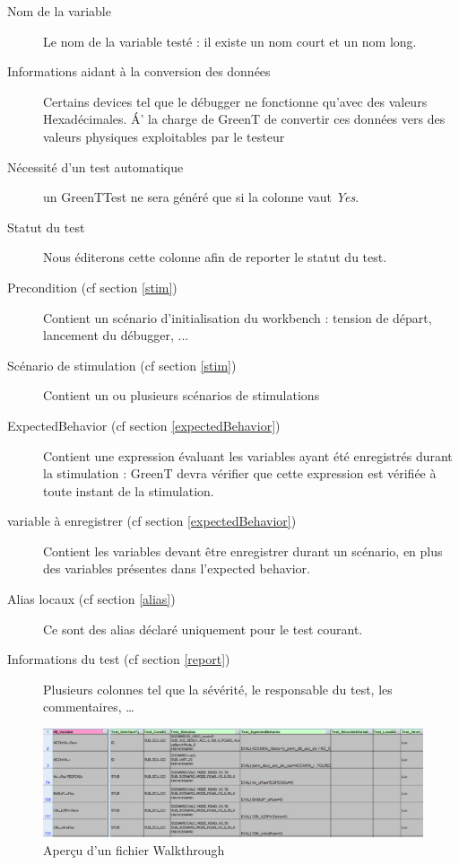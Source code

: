 		\begin{description} 
			\item[Nom de la variable] Le nom de la variable testé : il existe un nom court et un nom long.
			\item[Informations aidant à la conversion des données] Certains devices tel que le débugger ne fonctionne qu'avec des valeurs Hexadécimales. \'A' la charge de GreenT de convertir ces données vers des valeurs physiques exploitables par le testeur
			\item[Nécessité d'un test automatique] un GreenTTest ne sera généré que si la colonne vaut \textit{Yes}.
			\item[Statut du test] Nous éditerons cette colonne afin de reporter le statut du test.
			\item[Precondition (cf section \ref{stim})] Contient un scénario d'initialisation du workbench : tension de départ, lancement du débugger, ...
			\item[Scénario de stimulation (cf section \ref{stim})] Contient un ou plusieurs scénarios de stimulations
			\item[ExpectedBehavior (cf section \ref{expectedBehavior})] Contient une expression évaluant les variables ayant été enregistrés durant la stimulation : GreenT devra vérifier que cette expression est vérifiée à toute instant de la stimulation.
			\item[variable à enregistrer (cf section \ref{expectedBehavior})] Contient les variables devant être enregistrer durant un scénario, en plus des variables présentes dans l'expected behavior.
			\item[Alias locaux (cf section \ref{alias})] Ce sont des alias déclaré uniquement pour le test courant.
			\item[Informations du test (cf section \ref{report})] Plusieurs colonnes tel que la sévérité, le responsable du test, les commentaires, \ldots
		\end{description}

		\begin{figure}[H]
			\centering
			\includegraphics[width=18.5cm]{contents/images/walkthrough.png}
			\caption{Aperçu d'un fichier Walkthrough}
		\end{figure}

